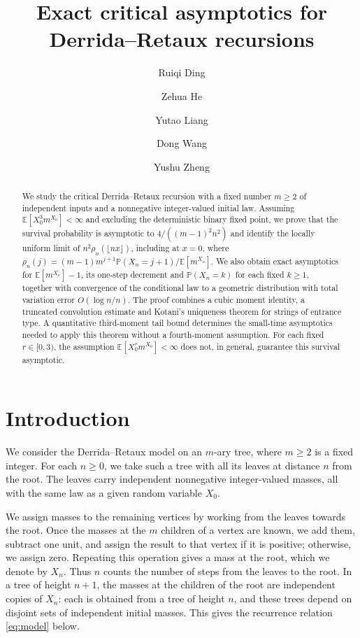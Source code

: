 \documentclass[11pt,letterpaper,reqno]{amsart}
\title[Critical Derrida--Retaux recursions]{Exact critical asymptotics for Derrida--Retaux recursions}
\author[R. Ding]{Ruiqi Ding\authormark{1,2,a}}
\author[Z. He]{Zehua He\authormark{1,2,b}}
\author[Y. Liang]{Yutao Liang\authormark{1,2,c}}
\author[D. Wang]{Dong Wang\authormark{2,d}}
\author[Y. Zheng]{Yushu Zheng\authormark{3,e}}
\date{}
\numberwithin{equation}{section}
\theoremstyle{plain}
\theoremstyle{remark}
\newcommand{\E}{\mathbb E}\newcommand{\Pp}{\mathbb P}
\newcommand{\floor}[1]{\lfloor#1\rfloor}
\begin{document}
\begin{abstract}
We study the critical Derrida--Retaux recursion with a fixed number $m\ge2$ of independent inputs and a nonnegative integer-valued initial law.
%
Assuming $\E[X_0^3m^{X_0}]<\infty$ and excluding the deterministic binary fixed point, we prove that the survival probability is asymptotic to $4/((m-1)^2n^2)$ and identify the locally uniform limit of $n^2\rho_n(\floor{nx})$, including at $x=0$, where $\rho_n(j)=(m-1)m^{j+1}\Pp(X_n=j+1)/\E[m^{X_n}]$.
%
We also obtain exact asymptotics for $\E[m^{X_n}]-1$, its one-step decrement and $\Pp(X_n=k)$ for each fixed $k\ge1$, together with convergence of the conditional law to a geometric distribution with total variation error $O(\log n/n)$.
%
The proof combines a cubic moment identity, a truncated convolution estimate and Kotani's uniqueness theorem for strings of entrance type.
%
A quantitative third-moment tail bound determines the small-time asymptotics needed to apply this theorem without a fourth-moment assumption.
%
For each fixed $r\in[0,3)$, the assumption $\E[X_0^rm^{X_0}]<\infty$ does not, in general, guarantee this survival asymptotic.
\end{abstract}
\maketitle

\section{Introduction}
We consider the Derrida--Retaux model on an $m$-ary tree, where $m\ge2$ is a fixed integer. For each $n\ge0$, we take such a tree with all its leaves at distance $n$ from the root. The leaves carry independent nonnegative integer-valued masses, all with the same law as a given random variable $X_0$.

We assign masses to the remaining vertices by working from the leaves towards the root. Once the masses at the $m$ children of a vertex are known, we add them, subtract one unit, and assign the result to that vertex if it is positive; otherwise, we assign zero. Repeating this operation gives a mass at the root, which we denote by $X_n$. Thus $n$ counts the number of steps from the leaves to the root. In a tree of height $n+1$, the masses at the children of the root are independent copies of $X_n$: each is obtained from a tree of height $n$, and these trees depend on disjoint sets of independent initial masses. This gives the recurrence relation \eqref{eq:model} below.
\end{document}
